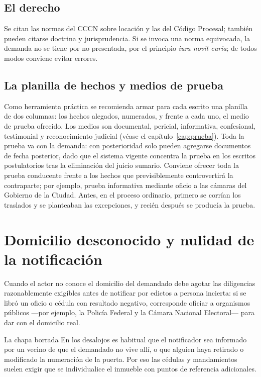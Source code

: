 \documentclass[12pt,oneside]{book}
\begin{document}
\subsection{El derecho}

Se citan las normas del CCCN sobre locación y las del Código Procesal; también pueden citarse doctrina y jurisprudencia. Si se invoca una norma equivocada, la demanda no se tiene por no presentada, por el principio \emph{iura novit curia}; de todos modos conviene evitar errores.

\subsection{La planilla de hechos y medios de prueba}

Como herramienta práctica se recomienda armar para cada escrito una planilla de dos columnas: los hechos alegados, numerados, y frente a cada uno, el medio de prueba ofrecido. Los medios son documental, pericial, informativa, confesional, testimonial y reconocimiento judicial (véase el capítulo~\ref{cap:prueba}). Toda la prueba va con la demanda: con posterioridad solo pueden agregarse documentos de fecha posterior, dado que el sistema vigente concentra la prueba en los escritos postulatorios tras la eliminación del juicio sumario. Conviene ofrecer toda la prueba conducente frente a los hechos que previsiblemente controvertirá la contraparte; por ejemplo, prueba informativa mediante oficio a las cámaras del Gobierno de la Ciudad. Antes, en el proceso ordinario, primero se corrían los traslados y se planteaban las excepciones, y recién después se producía la prueba.

\section{Domicilio desconocido y nulidad de la notificación}

\begin{important}
Cuando el actor no conoce el domicilio del demandado debe agotar las diligencias razonablemente exigibles antes de notificar por edictos a persona incierta: si se libró un oficio o cédula con resultado negativo, corresponde oficiar a organismos públicos ---por ejemplo, la Policía Federal y la Cámara Nacional Electoral--- para dar con el domicilio real.
\end{important}

\begin{example}{La chapa borrada}
En los desalojos es habitual que el notificador sea informado por un vecino de que el demandado no vive allí, o que alguien haya retirado o modificado la numeración de la puerta. Por eso las cédulas y mandamientos suelen exigir que se individualice el inmueble con puntos de referencia adicionales.
\end{example}
\end{document}
